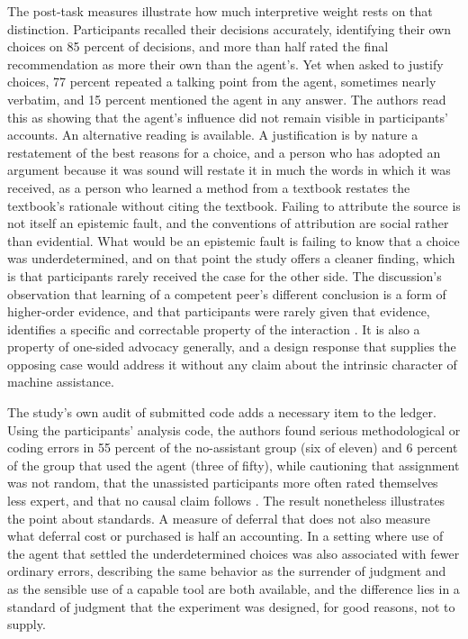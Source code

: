 \documentclass[11pt]{article}
\begin{document}
The post-task measures illustrate how much interpretive weight rests on that distinction. Participants recalled their decisions accurately, identifying their own choices on 85 percent of decisions, and more than half rated the final recommendation as more their own than the agent's. Yet when asked to justify choices, 77 percent repeated a talking point from the agent, sometimes nearly verbatim, and 15 percent mentioned the agent in any answer. The authors read this as showing that the agent's influence did not remain visible in participants' accounts. An alternative reading is available. A justification is by nature a restatement of the best reasons for a choice, and a person who has adopted an argument because it was sound will restate it in much the words in which it was received, as a person who learned a method from a textbook restates the textbook's rationale without citing the textbook. Failing to attribute the source is not itself an epistemic fault, and the conventions of attribution are social rather than evidential. What would be an epistemic fault is failing to know that a choice was underdetermined, and on that point the study offers a cleaner finding, which is that participants rarely received the case for the other side. The discussion's observation that learning of a competent peer's different conclusion is a form of higher-order evidence, and that participants were rarely given that evidence, identifies a specific and correctable property of the interaction \cite{herdagdelen}. It is also a property of one-sided advocacy generally, and a design response that supplies the opposing case would address it without any claim about the intrinsic character of machine assistance.

The study's own audit of submitted code adds a necessary item to the ledger. Using the participants' analysis code, the authors found serious methodological or coding errors in 55 percent of the no-assistant group (six of eleven) and 6 percent of the group that used the agent (three of fifty), while cautioning that assignment was not random, that the unassisted participants more often rated themselves less expert, and that no causal claim follows \cite{herdagdelen}. The result nonetheless illustrates the point about standards. A measure of deferral that does not also measure what deferral cost or purchased is half an accounting. In a setting where use of the agent that settled the underdetermined choices was also associated with fewer ordinary errors, describing the same behavior as the surrender of judgment and as the sensible use of a capable tool are both available, and the difference lies in a standard of judgment that the experiment was designed, for good reasons, not to supply.
\end{document}
